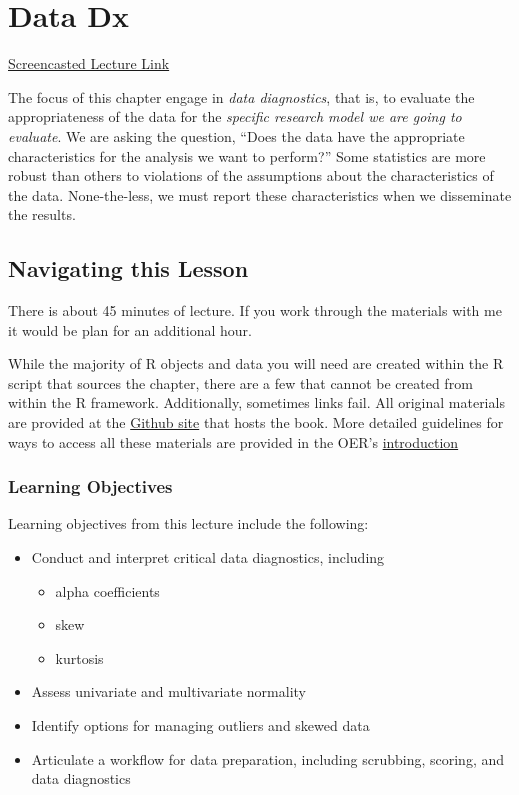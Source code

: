\documentclass[
]{book}
\providecommand{\tightlist}{%
  \setlength{\itemsep}{0pt}\setlength{\parskip}{0pt}}
\begin{document}
\hypertarget{DataDx}{%
\chapter{Data Dx}\label{DataDx}}

\href{https://spu.hosted.panopto.com/Panopto/Pages/Viewer.aspx?pid=43dbe818-8186-498d-8e84-acf7000acb5b}{Screencasted Lecture Link}

The focus of this chapter engage in \emph{data diagnostics}, that is, to evaluate the appropriateness of the data for the \emph{specific research model we are going to evaluate}. We are asking the question, ``Does the data have the appropriate characteristics for the analysis we want to perform?'' Some statistics are more robust than others to violations of the assumptions about the characteristics of the data. None-the-less, we must report these characteristics when we disseminate the results.

\hypertarget{navigating-this-lesson-2}{%
\section{Navigating this Lesson}\label{navigating-this-lesson-2}}

There is about 45 minutes of lecture. If you work through the materials with me it would be plan for an additional hour.

While the majority of R objects and data you will need are created within the R script that sources the chapter, there are a few that cannot be created from within the R framework. Additionally, sometimes links fail. All original materials are provided at the \href{https://github.com/lhbikos/ReC_MultivModel}{Github site} that hosts the book. More detailed guidelines for ways to access all these materials are provided in the OER's \protect\hyperlink{ReCintro}{introduction}

\hypertarget{learning-objectives-2}{%
\subsection{Learning Objectives}\label{learning-objectives-2}}

Learning objectives from this lecture include the following:

\begin{itemize}
\tightlist
\item
  Conduct and interpret critical data diagnostics, including

  \begin{itemize}
  \tightlist
  \item
    alpha coefficients
  \item
    skew
  \item
    kurtosis
  \end{itemize}
\item
  Assess univariate and multivariate normality
\item
  Identify options for managing outliers and skewed data
\item
  Articulate a workflow for data preparation, including scrubbing, scoring, and data diagnostics
\end{itemize}
\end{document}
